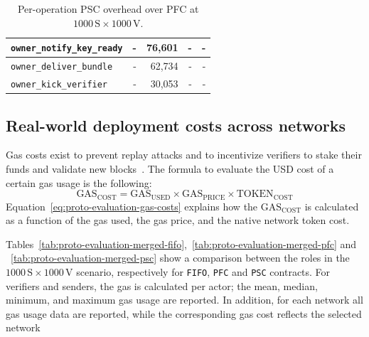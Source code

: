\begin{table}
\begin{tabular}{|l|r|r|r|r|}
        \hline
        \texttt{owner\_notify\_key\_ready} & -         & 76,601    & -              & -             \\
        \hline
        \texttt{owner\_deliver\_bundle}    & -         & 62,734    & -              & -             \\
        \hline
        \texttt{owner\_kick\_verifier}     & -         & 30,053    & -              & -             \\
        \hline
    \end{tabular}
    \caption{Per-operation PSC overhead over PFC at $1000\,\text{S} \times 1000\,\text{V}$.}
    \label{tab:proto-evaluation-psc-overhead-1000s-1000v}
\end{table}

\subsection{Real-world deployment costs across networks}\label{subsec:gas-real-world-costs}
Gas costs exist to prevent replay attacks and to incentivize verifiers to stake their funds and validate new blocks~\cite{wood2014ethereum}.
The formula to evaluate the USD cost of a certain gas usage is the following:
\begin{equation}
    \text{GAS}_{\text{COST}} = \text{GAS}_{\text{USED}} \times \text{GAS}_{\text{PRICE}} \times \text{TOKEN}_{\text{COST}}
    \label{eq:proto-evaluation-gas-costs}
\end{equation}
Equation~\ref{eq:proto-evaluation-gas-costs} explains how the $\text{GAS}_{\text{COST}}$ is calculated as a function of the gas used, the gas price, and the native network token cost.

Tables~\ref{tab:proto-evaluation-merged-fifo},~\ref{tab:proto-evaluation-merged-pfc} and ~\ref{tab:proto-evaluation-merged-psc} show a comparison between the roles in the $1000\,\text{S} \times 1000\,\text{V}$ scenario, respectively for \texttt{FIFO}, \texttt{PFC} and \texttt{PSC} contracts.
For verifiers and senders, the gas is calculated per actor; the mean, median, minimum, and maximum gas usage are reported.
In addition, for each network all gas usage data are reported, while the corresponding gas cost reflects the selected network

